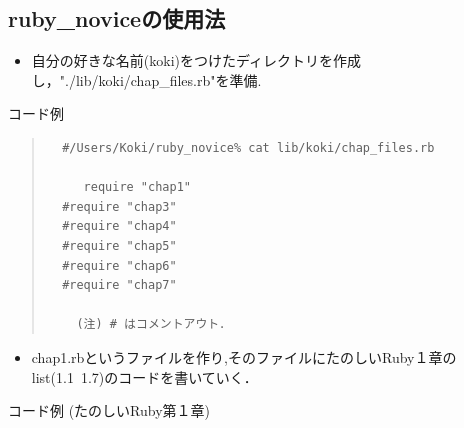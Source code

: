 \subsection{ruby\_noviceの使用法}
\begin{itemize}
\item 自分の好きな名前(koki)をつけたディレクトリを作成し，"./lib/koki/chap\_files.rb"を準備.
\end{itemize}
コード例
\begin{quote}\begin{verbatim}
  #/Users/Koki/ruby_novice% cat lib/koki/chap_files.rb
	
	 require "chap1"
  #require "chap3" 
  #require "chap4"
  #require "chap5"
  #require "chap6"
  #require "chap7"

	(注) # はコメントアウト．
\end{verbatim}\end{quote}
\begin{itemize}
\item chap1.rbというファイルを作り,そのファイルにたのしいRuby１章のlist(1.1~1.7)のコードを書いていく．
\end{itemize}
コード例 (たのしいRuby第１章)
